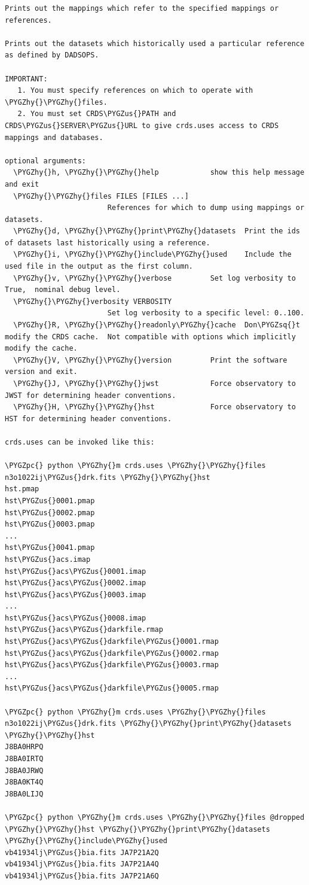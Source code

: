 \documentclass[letterpaper,10pt,english]{sphinxmanual}
\def\PYGZus{\char`\_}
\def\PYGZpc{\char`\%}
\def\PYGZhy{\char`\-}
\def\PYGZsq{\char`\'}
\renewcommand\PYGZsq{\textquotesingle}
\begin{document}
\begin{Verbatim}[commandchars=\\\{\}]
Prints out the mappings which refer to the specified mappings or references.

Prints out the datasets which historically used a particular reference as defined by DADSOPS.

IMPORTANT:
   1. You must specify references on which to operate with \PYGZhy{}\PYGZhy{}files.
   2. You must set CRDS\PYGZus{}PATH and CRDS\PYGZus{}SERVER\PYGZus{}URL to give crds.uses access to CRDS mappings and databases.

optional arguments:
  \PYGZhy{}h, \PYGZhy{}\PYGZhy{}help            show this help message and exit
  \PYGZhy{}\PYGZhy{}files FILES [FILES ...]
                        References for which to dump using mappings or datasets.
  \PYGZhy{}d, \PYGZhy{}\PYGZhy{}print\PYGZhy{}datasets  Print the ids of datasets last historically using a reference.
  \PYGZhy{}i, \PYGZhy{}\PYGZhy{}include\PYGZhy{}used    Include the used file in the output as the first column.
  \PYGZhy{}v, \PYGZhy{}\PYGZhy{}verbose         Set log verbosity to True,  nominal debug level.
  \PYGZhy{}\PYGZhy{}verbosity VERBOSITY
                        Set log verbosity to a specific level: 0..100.
  \PYGZhy{}R, \PYGZhy{}\PYGZhy{}readonly\PYGZhy{}cache  Don\PYGZsq{}t modify the CRDS cache.  Not compatible with options which implicitly modify the cache.
  \PYGZhy{}V, \PYGZhy{}\PYGZhy{}version         Print the software version and exit.
  \PYGZhy{}J, \PYGZhy{}\PYGZhy{}jwst            Force observatory to JWST for determining header conventions.
  \PYGZhy{}H, \PYGZhy{}\PYGZhy{}hst             Force observatory to HST for determining header conventions.

crds.uses can be invoked like this:

\PYGZpc{} python \PYGZhy{}m crds.uses \PYGZhy{}\PYGZhy{}files n3o1022ij\PYGZus{}drk.fits \PYGZhy{}\PYGZhy{}hst
hst.pmap
hst\PYGZus{}0001.pmap
hst\PYGZus{}0002.pmap
hst\PYGZus{}0003.pmap
...
hst\PYGZus{}0041.pmap
hst\PYGZus{}acs.imap
hst\PYGZus{}acs\PYGZus{}0001.imap
hst\PYGZus{}acs\PYGZus{}0002.imap
hst\PYGZus{}acs\PYGZus{}0003.imap
...
hst\PYGZus{}acs\PYGZus{}0008.imap
hst\PYGZus{}acs\PYGZus{}darkfile.rmap
hst\PYGZus{}acs\PYGZus{}darkfile\PYGZus{}0001.rmap
hst\PYGZus{}acs\PYGZus{}darkfile\PYGZus{}0002.rmap
hst\PYGZus{}acs\PYGZus{}darkfile\PYGZus{}0003.rmap
...
hst\PYGZus{}acs\PYGZus{}darkfile\PYGZus{}0005.rmap

\PYGZpc{} python \PYGZhy{}m crds.uses \PYGZhy{}\PYGZhy{}files n3o1022ij\PYGZus{}drk.fits \PYGZhy{}\PYGZhy{}print\PYGZhy{}datasets \PYGZhy{}\PYGZhy{}hst
J8BA0HRPQ
J8BA0IRTQ
J8BA0JRWQ
J8BA0KT4Q
J8BA0LIJQ

\PYGZpc{} python \PYGZhy{}m crds.uses \PYGZhy{}\PYGZhy{}files @dropped \PYGZhy{}\PYGZhy{}hst \PYGZhy{}\PYGZhy{}print\PYGZhy{}datasets \PYGZhy{}\PYGZhy{}include\PYGZhy{}used
vb41934lj\PYGZus{}bia.fits JA7P21A2Q
vb41934lj\PYGZus{}bia.fits JA7P21A4Q
vb41934lj\PYGZus{}bia.fits JA7P21A6Q
\end{Verbatim}
\end{document}
